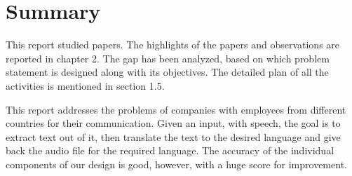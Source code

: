 \clearpage
\chapter{Summary}
{\normalsize{\par This report studied papers. The highlights of the papers and observations are reported in chapter 2. The gap has been analyzed, based on which problem statement is designed along with its objectives. The detailed plan of all the activities is mentioned in section 1.5. \\
\par This report addresses the problems of companies with employees from different countries for their communication. Given an input, with speech, the goal is to extract text out of it, then translate the text to the desired language and give back the audio file for the required language. The accuracy of the individual components of our design is good, however, with a huge score for improvement.	
}}